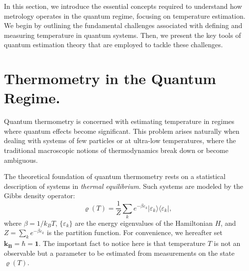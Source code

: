 In this section, we introduce the essential concepts required to understand how metrology operates in the quantum regime, focusing on temperature estimation. We begin by outlining the fundamental challenges associated with defining and measuring temperature in quantum systems. Then, we present the key tools of quantum estimation theory that are employed to tackle these challenges.

\section{Thermometry in the Quantum Regime.}
Quantum thermometry is concerned with estimating temperature in regimes where quantum effects become significant. This problem arises naturally when dealing with systems of few particles or at ultra-low temperatures, where the traditional macroscopic notions of thermodynamics break down or become ambiguous.

The theoretical foundation of quantum thermometry rests on a statistical description of systems in \textit{thermal equilibrium}. Such systems are modeled by the Gibbs density operator:
\begin{equation}\label{Gibbs operator}
{\varrho}(T) = \frac{1}{Z} \sum_k e^{-\beta \varepsilon_k} |\varepsilon_k\rangle\langle\varepsilon_k|,
\end{equation}
where \( \beta = 1/k_B T \), \( \{ \varepsilon_k \} \) are the energy eigenvalues of the Hamiltonian \( {H} \), and \( Z = \sum_k e^{-\beta \varepsilon_k} \) is the partition function. For convenience, we hereafter set $\mathbf{k_B = \hbar = 1}$. The important fact to notice here is that temperature \( T \) is not an observable but a parameter to be estimated from measurements on the state \( {\varrho}(T) \).

